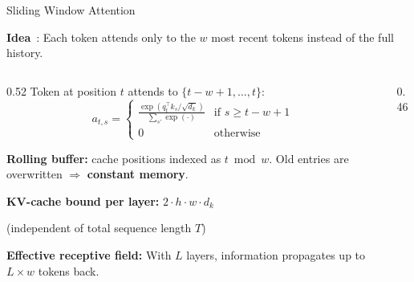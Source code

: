 \begin{frame}{Sliding Window Attention}

  \textbf{Idea}~\cite{jiang2023mistral}: Each token attends only to the $w$ most recent tokens
  instead of the full history.

  \vspace{0.3em}
  \begin{columns}[T]
    \begin{column}{0.52\textwidth}
      Token at position $t$ attends to $\{t{-}w{+}1, \ldots, t\}$:
      \[
        a_{t,s} = \begin{cases}
          \frac{\exp(q_t^\top k_s / \sqrt{d_k})}{\sum_{s'} \exp(\cdot)} & \text{if } s \geq t{-}w{+}1 \\
          0 & \text{otherwise}
        \end{cases}
      \]

      \textbf{Rolling buffer:} cache positions indexed as $t \bmod w$.
      Old entries are overwritten $\Rightarrow$ \textbf{constant memory}.

      \vspace{0.3em}
      \textbf{KV-cache bound per layer:} $2 \cdot h \cdot w \cdot d_k$

      {\footnotesize (independent of total sequence length $T$)}

      \vspace{0.3em}
      \textbf{Effective receptive field:}
      With $L$ layers, information propagates up to $L \times w$ tokens back.
    \end{column}
    \begin{column}{0.46\textwidth}
      \centering
\end{column}
\end{columns}
\end{frame}
